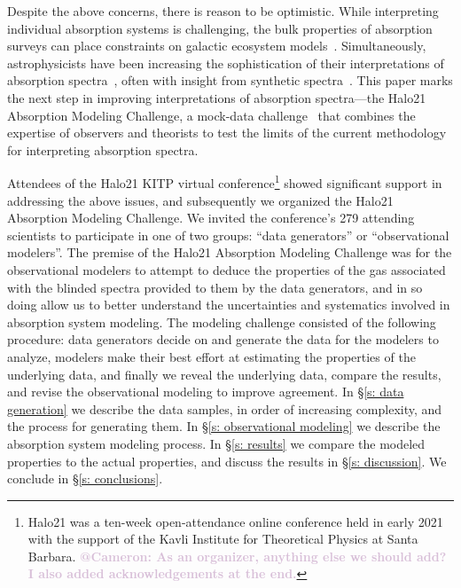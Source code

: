 \documentclass[fleqn,usenatbib]{mnras}
\makeatletter
\newcommand{\atcameron}[1]{\textcolor{Thistle}{\textbf{@Cameron: #1}}}
\makeatother
\begin{document}
Despite the above concerns, there is reason to be optimistic.
While interpreting individual absorption systems is challenging, the bulk properties of absorption surveys can place constraints on galactic ecosystem models~\citep[e.g.][]{Sorini2018, Lan2018}.
Simultaneously, astrophysicists have been increasing the sophistication of their interpretations of absorption spectra~\citep[e.g.][]{Churchill2015, Sameer2021}, often with insight from synthetic spectra~\citep[e.g.][]{Hummels2013, Liang2018}.
This paper marks the next step in improving interpretations of absorption spectra---the Halo21 Absorption Modeling Challenge, a mock-data challenge~\citep[e.g.][]{Regimbau2012, Meacher2015, Hazboun2019} that combines the expertise of observers and theorists to test the limits of the current methodology for interpreting absorption spectra.

Attendees of the Halo21 KITP virtual conference\footnote{Halo21 was a ten-week open-attendance online conference held in early 2021 with the support of the Kavli Institute for Theoretical Physics at Santa Barbara. \atcameron{As an organizer, anything else we should add? I also added acknowledgements at the end.}} showed significant support in addressing the above issues, and subsequently we organized the Halo21 Absorption Modeling Challenge.
We invited the conference's 279 attending scientists to participate in one of two groups: ``data generators'' or ``observational modelers''.
The premise of the Halo21 Absorption Modeling Challenge was for the observational modelers to attempt to deduce the properties of the gas associated with the blinded spectra provided to them by the data generators, and in so doing allow us to better understand the uncertainties and systematics involved in absorption system modeling.
The modeling challenge consisted of the following procedure:
data generators decide on and generate the data for the modelers to analyze, modelers make their best effort at estimating the properties of the underlying data, and finally we reveal the underlying data, compare the results, and revise the observational modeling to improve agreement.
In \S\ref{s: data generation} we describe the data samples, in order of increasing complexity, and the process for generating them.
In \S\ref{s: observational modeling} we describe the absorption system modeling process.
In \S\ref{s: results} we compare the modeled properties to the actual properties, and discuss the results in \S\ref{s: discussion}.
We conclude in \S\ref{s: conclusions}.
\end{document}
